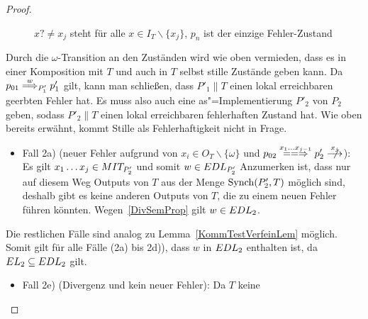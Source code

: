 \begin{proof}
\begin{itemize}
\begin{figure} [h!tbp]
\begin{center}
        \caption{$x?\neq x_j$ steht für alle $x\in I_T\backslash\{x_j\}$, $p_n$
          ist der einzige Fehler-Zustand}
      \label{TmitEundO}
      \end{center}
      \end{figure}
      Durch die $\omega$-Transition an den Zuständen wird wie oben vermieden,
      dass es in einer Komposition mit $T$ und auch in $T$ selbst
      stille Zustände geben kann. Da $p_{01} \weakmust[w]_{P'_1} p'_1$ gilt,
      kann man schließen, dass $P'_1\|T$ einen lokal erreichbaren geerbten
      Fehler hat. Es muss also auch eine as"=Implementierung $P'_2$ von $P_2$
      geben, sodass $P'_2\|T$ einen lokal erreichbaren fehlerhaften Zustand
      hat. Wie oben bereits erwähnt, kommt Stille als Fehlerhaftigkeit nicht in
      Frage.
      \begin{itemize}
        \item Fall 2a) \big(neuer Fehler aufgrund von $x_i\in O_T\backslash
          \{\omega\}$ und $p_{02} \lweakmay[x_1\dots x_{j-1}] p'_2
          \nmust[x_j]$\big): Es gilt $x_1\dots x_j\in MIT _{P'_2}$ und somit
          $w\in EDL _{P'_2}$ Anzumerken ist, dass nur auf diesem Weg Outputs
          von $T$ aus der Menge $\mathrm{Synch} (P'_2,T)$ möglich sind, deshalb gibt es
          keine anderen Outputs von $T$, die zu einem neuen Fehler führen
          könnten. Wegen~\ref{DivSemProp} gilt $w\in EDL _2$.
      \end{itemize}
      Die restlichen Fälle sind analog zu Lemma~\ref{KommTestVerfeinLem}
      möglich. Somit gilt für alle Fälle (2a) bis 2d)), dass $w$ in $EDL _2$
      enthalten ist, da $EL _2\subseteq EDL _2$ gilt.
      \begin{itemize}
        \item Fall 2e) (Divergenz und kein neuer Fehler): Da $T$ keine

\end{itemize}
\end{itemize}
\end{proof}
